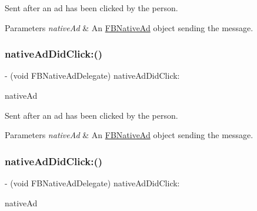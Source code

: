 Sent after an ad has been clicked by the person.


\begin{DoxyParams}{Parameters}
{\em native\+Ad} & An \hyperlink{interfaceFBNativeAd}{F\+B\+Native\+Ad} object sending the message. \\
\hline
\end{DoxyParams}
\mbox{\label{protocolFBNativeAdDelegate_01-p_a6f95570584b282e947d029d855242d11}} 
\subsubsection{\texorpdfstring{native\+Ad\+Did\+Click\+:()}{nativeAdDidClick:()}\hspace{0.1cm}{\footnotesize\ttfamily [2/5]}}
{\footnotesize\ttfamily -\/ (void F\+B\+Native\+Ad\+Delegate) native\+Ad\+Did\+Click\+: \begin{DoxyParamCaption}\item[{(\hyperlink{interfaceFBNativeAd}{F\+B\+Native\+Ad} $\ast$)}]{native\+Ad }\end{DoxyParamCaption}}

Sent after an ad has been clicked by the person.


\begin{DoxyParams}{Parameters}
{\em native\+Ad} & An \hyperlink{interfaceFBNativeAd}{F\+B\+Native\+Ad} object sending the message. \\
\hline
\end{DoxyParams}
\mbox{\label{protocolFBNativeAdDelegate_01-p_a6f95570584b282e947d029d855242d11}} 
\subsubsection{\texorpdfstring{native\+Ad\+Did\+Click\+:()}{nativeAdDidClick:()}\hspace{0.1cm}{\footnotesize\ttfamily [3/5]}}
{\footnotesize\ttfamily -\/ (void F\+B\+Native\+Ad\+Delegate) native\+Ad\+Did\+Click\+: \begin{DoxyParamCaption}\item[{(\hyperlink{interfaceFBNativeAd}{F\+B\+Native\+Ad} $\ast$)}]{native\+Ad }\end{DoxyParamCaption}}

